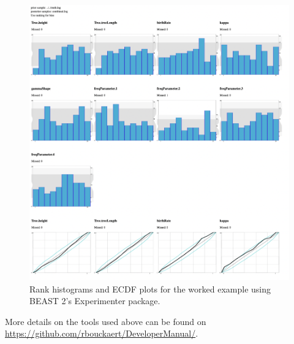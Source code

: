 \documentclass[oneside]{article}
\begin{document}
\begin{figure}
  \centering
  \includegraphics[width=\textwidth]{../figures/sbscalculator.png}
  \caption{Rank histograms and ECDF plots for the worked example using BEAST 2's Experimenter package.}
  \label{supfig:experimenterruv}
\end{figure}

More details on the tools used above can be found on \url{https://github.com/rbouckaert/DeveloperManual/}.

\clearpage


\end{document}
